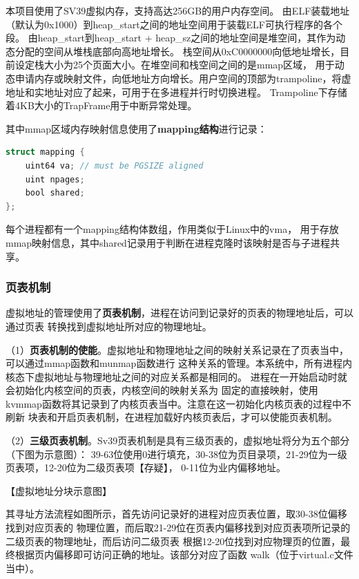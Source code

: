 \documentclass[UTF8,a4paper,10pt]{ctexart}
\begin{document}
本项目使用了SV39虚拟内存，支持高达256GB的用户内存空间。
由ELF装载地址（默认为0x1000）到heap\_start之间的地址空间用于装载ELF可执行程序的各个段。
由heap\_start到heap\_start + heap\_sz之间的地址空间是堆空间，其作为动态分配的空间从堆栈底部向高地址增长。
栈空间从0xC0000000向低地址增长，目前设定栈大小为25个页面大小。在堆空间和栈空间之间的是mmap区域，
用于动态申请内存或映射文件，向低地址方向增长。用户空间的顶部为trampoline，将虚地址和实地址对应了起来，可用于在多进程并行时切换进程。
Trampoline下存储着4KB大小的TrapFrame用于中断异常处理。

其中mmap区域内存映射信息使用了\textbf{mapping结构}进行记录：

\begin{lstlisting}[title=mapping结构,frame=trbl,language={C}]
  struct mapping {
    uint64 va; // must be PGSIZE aligned
    uint npages;
    bool shared;
};
  \end{lstlisting}

每个进程都有一个mapping结构体数组，作用类似于Linux中的vma，
用于存放mmap映射信息，其中shared记录用于判断在进程克隆时该映射是否与子进程共享。

\subsubsection{页表机制}

虚拟地址的管理使用了\textbf{页表机制}，进程在访问到记录好的页表的物理地址后，可以通过页表
转换找到虚拟地址所对应的物理地址。

（1）\textbf{页表机制的使能}。虚拟地址和物理地址之间的映射关系记录在了页表当中，可以通过mmap函数和munmap函数进行
这种关系的管理。本系统中，所有进程内核态下虚拟地址与物理地址之间的对应关系都是相同的。
进程在一开始启动时就会初始化内核空间的页表，内核空间的映射关系为
固定的直接映射，使用kvmmap函数将其记录到了内核页表当中。注意在这一初始化内核页表的过程中不刷新
块表和开启页表机制，在进程加载好内核页表后，才可以使能页表机制。

（2）\textbf{三级页表机制}。Sv39页表机制是具有三级页表的，虚拟地址将分为五个部分（下图为示意图）：
39-63位使用0进行填充，30-38位为页目录项，21-29位为一级页表项，12-20位为二级页表项【存疑】，
0-11位为业内偏移地址。

【虚拟地址分块示意图】

其寻址方法流程如图所示，首先访问记录好的进程对应页表位置，取30-38位偏移找到对应页表的
物理位置，而后取21-29位在页表内偏移找到对应页表项所记录的二级页表的物理地址，而后访问二级页表
根据12-20位找到对应物理页的位置，最终根据页内偏移即可访问正确的地址。该部分对应了函数
walk（位于virtual.c文件当中）。
\end{document}
